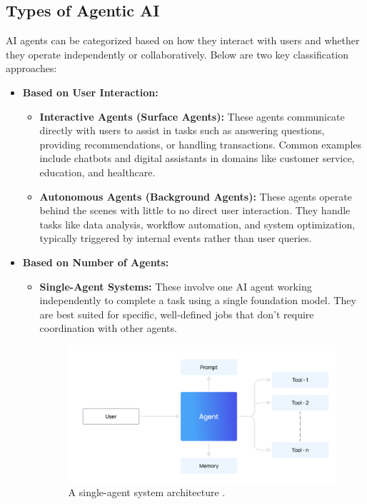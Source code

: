 \begin{figure}
	
\end{figure}
\subsection{Types of Agentic AI}

AI agents can be categorized based on how they interact with users and whether they operate independently or collaboratively. Below are two key classification approaches\citep{google2025aiagent}:

\begin{itemize}
	\item \textbf{Based on User Interaction:}
	\begin{itemize}
		\item \textbf{Interactive Agents (Surface Agents):} These agents communicate directly with users to assist in tasks such as answering questions, providing recommendations, or handling transactions. Common examples include chatbots and digital assistants in domains like customer service, education, and healthcare.
		
		\item \textbf{Autonomous Agents (Background Agents):} These agents operate behind the scenes with little to no direct user interaction. They handle tasks like data analysis, workflow automation, and system optimization, typically triggered by internal events rather than user queries.
	\end{itemize}
	
	\item \textbf{Based on Number of Agents:}
	\begin{itemize}
		\item \textbf{Single-Agent Systems:} These involve one AI agent working independently to complete a task using a single foundation model. They are best suited for specific, well-defined jobs that don't require coordination with other agents.
		\begin{figure}[H]
			\centering
			\includegraphics[width=0.7\linewidth]{Figures/singlagent.png}
			\caption{
				A single-agent system architecture .
			}
		\end{figure}
		

\end{itemize}
\end{itemize}
